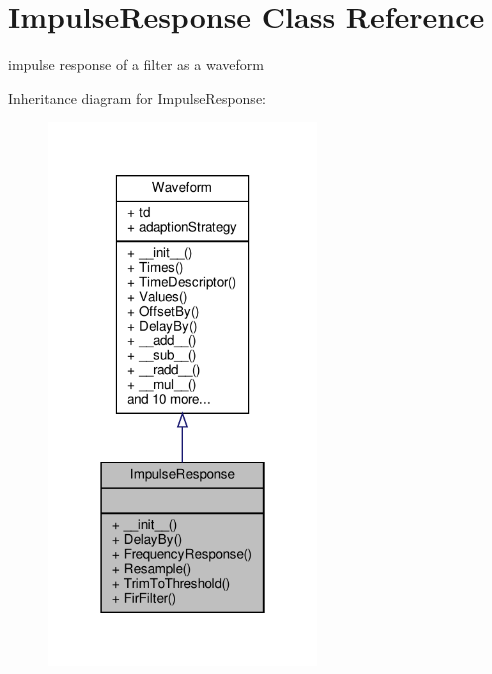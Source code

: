 \hypertarget{classSignalIntegrity_1_1TimeDomain_1_1Waveform_1_1ImpulseResponse_1_1ImpulseResponse}{}\section{Impulse\+Response Class Reference}
\label{classSignalIntegrity_1_1TimeDomain_1_1Waveform_1_1ImpulseResponse_1_1ImpulseResponse}


impulse response of a filter as a waveform  




Inheritance diagram for Impulse\+Response\+:
\nopagebreak
\begin{figure}[H]
\begin{center}
\leavevmode
\includegraphics[width=202pt]{classSignalIntegrity_1_1TimeDomain_1_1Waveform_1_1ImpulseResponse_1_1ImpulseResponse__inherit__graph}
\end{center}
\end{figure}


